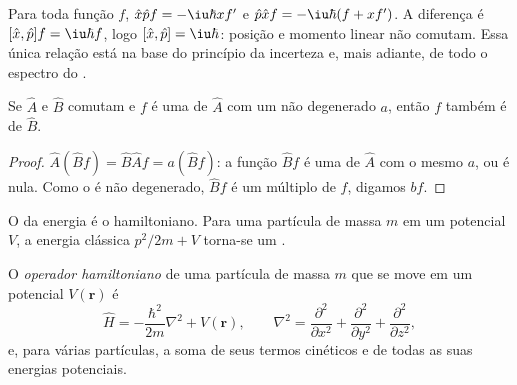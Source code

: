 \begin{example}\label{ex:b3:quantum-model-systems:canonical}
Para toda função $f$, $\hat x\hat pf = -\iu\hbar xf'$ e $\hat p\hat xf =
-\iu\hbar(f + xf')$. A diferença é $[\hat x,\hat p]f = \iu\hbar f$, logo
$[\hat x,\hat p] = \iu\hbar$: posição e momento linear não comutam. Essa
única relação está na base do princípio da incerteza e, mais adiante, de
todo o espectro do .
\end{example}

\begin{proposition}\label{prop:b3:quantum-model-systems:commuting}
Se $\hat A$ e $\hat B$ comutam e $f$ é uma  de $\hat A$
com um  não degenerado $a$, então $f$ também é  de
$\hat B$.
\end{proposition}

\begin{proof}
$\hat A(\hat Bf) = \hat B\hat Af = a(\hat Bf)$: a função $\hat Bf$ é uma
 de $\hat A$ com o mesmo  $a$, ou é nula. Como o
 é não degenerado, $\hat Bf$ é um múltiplo de $f$, digamos $bf$.
\end{proof}

O  da energia é o hamiltoniano. Para uma partícula de massa $m$ em
um potencial $V$, a energia clássica $p^2/2m + V$ torna-se um .

\begin{definition}\label{def:b3:quantum-model-systems:schrodinger}
O \emph{operador hamiltoniano} de uma partícula de
massa $m$ que se move em um potencial $V(\mathbf r)$ é
\[
\hat H = -\frac{\hbar^2}{2m}\nabla^2 + V(\mathbf r), \qquad \nabla^2 =
\frac{\partial^2}{\partial x^2} + \frac{\partial^2}{\partial y^2} +
\frac{\partial^2}{\partial z^2},
\]
e, para várias partículas, a soma de seus termos cinéticos e de todas as
suas energias potenciais.
\end{definition}

